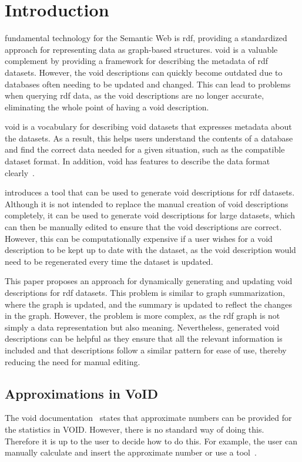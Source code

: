 \section{Introduction}\label{sec:introduction2}
 fundamental technology for the Semantic Web is \gls{rdf}, providing a standardized approach for representing data as graph-based structures. \gls{void} is a valuable complement by providing a framework for describing the metadata of \gls{rdf} datasets. However, the \gls{void} descriptions can quickly become outdated due to databases often needing to be updated and changed. This can lead to problems when querying \gls{rdf} data, as the \gls{void} descriptions are no longer accurate, eliminating the whole point of having a \gls{void} description.

\gls{void} is a vocabulary for describing \gls{void} datasets that expresses metadata about the datasets. As a result, this helps users understand the contents of a database and find the correct data needed for a given situation, such as the compatible dataset format. In addition, \gls{void} has features to describe the data format clearly~\cite{documentation-void}.

\cite{creating-void-descriptions} introduces a tool that can be used to generate \gls{void} descriptions for \gls{rdf} datasets. Although it is not intended to replace the manual creation of \gls{void} descriptions completely, it can be used to generate \gls{void} descriptions for large datasets, which can then be manually edited to ensure that the \gls{void} descriptions are correct. However, this can be computationally expensive if a user wishes for a \gls{void} description to be kept up to date with the dataset, as the \gls{void} description would need to be regenerated every time the dataset is updated.

This paper proposes an approach for dynamically generating and updating \gls{void} descriptions for \gls{rdf} datasets. This problem is similar to graph summarization, where the graph is updated, and the summary is updated to reflect the changes in the graph. However, the problem is more complex, as the \gls{rdf} graph is not simply a data representation but also meaning. Nevertheless, generated \gls{void} descriptions can be helpful as they ensure that all the relevant information is included and that descriptions follow a similar pattern for ease of use, thereby reducing the need for manual editing.

\subsection{Approximations in VoID} \label{sec:approximations}
The \gls{void} documentation~\cite{documentation-void} states that approximate numbers can be provided for the statistics in VOID.
However, there is no standard way of doing this. Therefore it is up to the user to decide how to do this. For example, the user can manually calculate and insert the approximate number or use a tool~\cite{the-web-of-data}.


